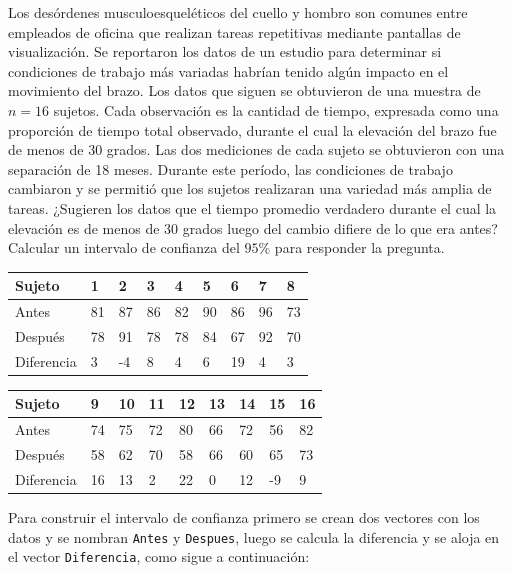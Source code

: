 \documentclass[
]{book}
\begin{document}
Los desórdenes musculoesqueléticos del cuello y hombro son comunes entre empleados de oficina que realizan tareas repetitivas mediante pantallas de visualización. Se reportaron los datos de un estudio para determinar si condiciones de trabajo más variadas habrían tenido algún impacto en el movimiento del brazo. Los datos que siguen se obtuvieron de una muestra de \(n=16\) sujetos. Cada observación es la cantidad de tiempo, expresada como una proporción de tiempo total observado, durante el cual la elevación del brazo fue de menos de 30 grados. Las dos mediciones de cada sujeto se obtuvieron con una separación de 18 meses. Durante este período, las condiciones de trabajo cambiaron y se permitió que los sujetos realizaran una variedad más amplia de tareas. ¿Sugieren los datos que el tiempo promedio verdadero durante el cual la elevación es de menos de 30 grados luego del cambio difiere de lo que era antes? Calcular un intervalo de confianza del \(95\%\) para responder la pregunta.

\begin{longtable}[]{@{}lllllllll@{}}
\toprule
Sujeto & 1 & 2 & 3 & 4 & 5 & 6 & 7 & 8 \\
\midrule
\endhead
Antes & 81 & 87 & 86 & 82 & 90 & 86 & 96 & 73 \\
Después & 78 & 91 & 78 & 78 & 84 & 67 & 92 & 70 \\
Diferencia & 3 & -4 & 8 & 4 & 6 & 19 & 4 & 3 \\
\bottomrule
\end{longtable}

\begin{longtable}[]{@{}lllllllll@{}}
\toprule
Sujeto & 9 & 10 & 11 & 12 & 13 & 14 & 15 & 16 \\
\midrule
\endhead
Antes & 74 & 75 & 72 & 80 & 66 & 72 & 56 & 82 \\
Después & 58 & 62 & 70 & 58 & 66 & 60 & 65 & 73 \\
Diferencia & 16 & 13 & 2 & 22 & 0 & 12 & -9 & 9 \\
\bottomrule
\end{longtable}

Para construir el intervalo de confianza primero se crean dos vectores con los datos y se nombran \texttt{Antes} y \texttt{Despues}, luego se calcula la diferencia y se aloja en el vector \texttt{Diferencia}, como sigue a continuación:
\end{document}
